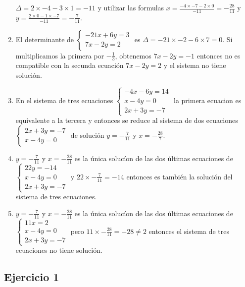 \begin{enumerate}
$\Delta = 2 \times -4 - 3 \times 1 = -11$ y utilizar las formulas
$x = \frac{-4 \times -7 - 2 \times 0}{-11} = -\frac{28}{11}$ y
$y = \frac{2 \times 0 - 1 \times -7}{-11} = -\frac{7}{11}$.
\item  El determinante de $\left\{
\begin{aligned}
  -21x+6y = 3 \\
  7x-2y = 2
\end{aligned}\right.$ es $\Delta = -21 \times -2 - 6 \times 7 = 0$. Si
multiplicamos la primera por $-\frac{1}{3}$, obtenemos $7x-2y=-1$ entonces
no es compatible con la secunda ecuación $7x-2y = 2$ y el sistema no tiene
solución.
\item En el sistema de tres ecuaciones $\left\{
\begin{aligned}
  -4x-6y = 14 \\
  x -4y = 0 \\
  2x+3y = -7
\end{aligned}\right.$ la primera ecuacion es equivalente a la tercera y
entonces se reduce al sistema de dos ecuaciones $\left\{\begin{aligned}
  2x+3y = -7 \\
  x -4y = 0
\end{aligned}\right.$ de solución $y = -\frac{7}{11}$ y
$x = -\frac{28}{7}$.
\item $y = -\frac{7}{11}$ y $x = -\frac{28}{11}$ es la única solucíon de las
dos últimas ecuaciones de $\left\{
\begin{aligned}
  22y = -14 \\
  x -4y = 0 \\
  2x+3y = -7
\end{aligned}\right.$ y $22 \times -\frac{7}{11} = -14$ entonces es también la
solución del sistema de tres ecuaciones.

\item $y = -\frac{7}{11}$ y $x = -\frac{28}{11}$ es la única solucíon de las
dos últimas ecuaciones de $\left\{
\begin{aligned}
  11x = 2 \\
  x -4y = 0 \\
  2x+3y = -7
\end{aligned}\right.$ pero
$11 \times -\frac{28}{11} = -28 \neq 2$ entonces el sistema de tres ecuaciones
no tiene solución.

\end{enumerate}

\subsection*{Ejercicio 1}


